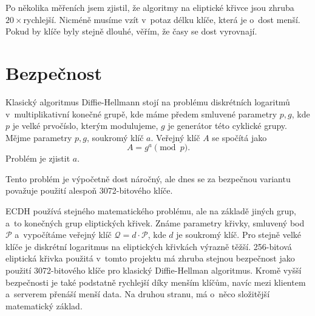 \documentclass[11pt, a4paper]{article}
\begin{document}
Po několika měřeních jsem zjistil, že algoritmy na eliptické křivce jsou zhruba\:$20\times$\:rychlejší.
Nic\-mé\-ně musíme vzít v~potaz délku klíče, která je o~dost menší.
Pokud by klíče byly stejně dlouhé, věřím, že časy se dost vyrovnají.

\section{Bezpečnost}

Klasický algoritmus Diffie-Hellmann stojí na problému diskrétních logaritmů v~multiplikativní konečné grupě, kde máme předem smluvené parametry $p, g$, kde $p$ je velké prvočíslo, kterým modulujeme, $g$ je generátor této cyklické grupy.
Mějme parametry $p, g$, soukromý klíč $a$.
Veřejný klíč $A$ se spočítá jako
\[
    A = g^a \pmod p.
\]  
Problém je zjistit $a$.

Tento problém je výpočetně dost náročný, ale dnes se za bezpečnou variantu považuje použití alespoň 3072-bitového klíče.

ECDH používá stejného matematického problému, ale na základě jiných grup, a~to konečných grup eliptických křivek.
Známe parametry křivky, smluvený bod $\mathcal{P}$ a~vypočítáme veřejný klíč $\mathcal{Q} = d \cdot \mathcal{P}$, kde $d$ je soukromý klíč.
Pro stejně velké klíče je diskrétní logaritmus na eliptických křivkách výrazně těžší.
256-bitová eliptická křivka použitá v~tomto projektu má zhruba stejnou bezpečnost jako použití 3072-bitového klíče pro klasický Diffie-Hellman algoritmus.
Kromě vyšší bezpečnosti je také podstatně rychlejší díky menším klíčům, navíc mezi klientem a~serverem přenáší menší data.
Na druhou stranu, má o~něco složitější matematický základ.
\end{document}
